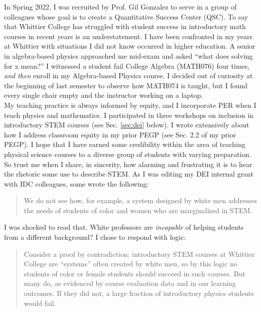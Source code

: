\documentclass[../../../main.tex]{subfiles}
\begin{document}
\label{sec:qsc}

In Spring 2022, I was recruited by Prof. Gil Gonzalez to serve in a group of colleagues whose goal is to create a Quantitative Success Center (QSC).  To say that Whittier College has struggled with student success in introductory math courses in recent years is an understatement.  I have been confronted in my years at Whittier with situations I did not know occurred in higher education.  A senior in algebra-based physics approached me mid-exam and asked ``what does solving for x mean?'' I witnessed a student fail College Algebra (MATH076) four times, \textit{and then} enroll in my Algebra-based Physics course.  I decided out of curiosity at the beginning of last semester to observe how MATH074 is taught, but I found every single chair empty and the instructor working on a laptop.
\\
\vspace{0.25cm}
My teaching practice is always informed by equity, and I incorporate PER when I teach physics and mathematics.  I participated in three workshops on inclusion in introductory STEM courses (see Sec. \ref{sec:dei} below).  I wrote extensively about how I address classroom equity in my prior PEGP (see Sec. 2.2 of my prior PEGP).  I hope that I have earned some credibility within the area of teaching physical science courses to a diverse group of students with varying preparation.  So trust me when I share, in sincerity, how alarming and frustrating it is to hear the rhetoric some use to describe STEM.  As I was editing my DEI internal grant with IDC colleagues, some wrote the following:

\begin{quotation}
We do not see how, for example, a system designed by white men addresses the needs of students of color and women who are marginalized in STEM.
\end{quotation}

I was shocked to read that.  White professors are \textit{incapable} of helping students from a different background?  I chose to respond with logic:

\begin{quotation}
Consider a proof by contradiction: introductory STEM courses at Whittier College are ``systems'' often created by white men, so by this logic no students of color or female students should succeed in such courses.  But many do, as evidenced by course evaluation data and in our learning outcomes. If they did not, a large fraction of introductory physics students would fail.
\end{quotation}
\end{document}
